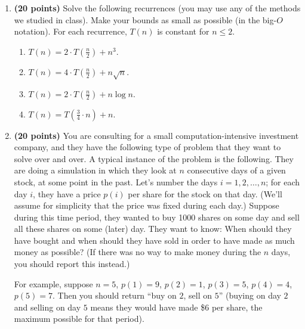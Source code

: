 \documentclass[11pt]{article}
\begin{document}
\begin{enumerate}
\begin{enumerate}
{\bf Hint:} Use the divide and conquer technique. Since $m\leq n$, you cannot sort the array $A$ because that would take $O(n\log n)$ time, which is not $O(n\log m)$ as $m$ may be much smaller than $n$.
\end{enumerate}


{\bf Note:}
You will receive the full 30 points if you give an $O(n\log m)$ time algorithm directly for (c) without giving any algorithms for (a) or (b).


\item
{\bf (20 points)}
Solve the following recurrences (you may use any of the methods we studied in class). Make your bounds as small as possible (in the big-$O$ notation). For each recurrence, $T(n)$ is constant for $n\leq 2$.

\begin{enumerate}

\item
$T(n)=2\cdot T(\frac{n}{2})+ n^3$.

\item
$T(n)=4\cdot T(\frac{n}{2})+n\sqrt{n}$.

\item
$T(n)=2\cdot T(\frac{n}{2})+n\log n$.

\item
$T(n)=T(\frac{3}{4}\cdot n)+n$.
\end{enumerate}

\item
 {\bf (20 points)}
You are consulting for a small computation-intensive investment company, and
they have the following type of problem that they want to solve over and over.
A typical instance of the problem is the following. They are doing a simulation
in which they look at $n$ consecutive days of a given stock, at some point in the past.
Let's number the days $i=1,2,\ldots,n$; for each day $i$, they have a price $p(i)$ per share for the stock on that day. (We'll assume for simplicity that the price was fixed during each day.) Suppose during this time period, they wanted to buy 1000 shares on some day and sell all these shares on some (later) day. They want to know: When should they have bought and when should they have sold in order to have made as much money as possible? (If there was no way to make money during the $n$ days, you should report this instead.)

For example, suppose $n=5$, $p(1)=9$, $p(2)=1$, $p(3)=5$, $p(4)=4$, $p(5)=7$. Then you should return ``buy on $2$, sell on $5$'' (buying on day $2$ and selling on day $5$ means they would have made \$6 per share, the maximum possible for that period).


\end{enumerate}
\end{document}
